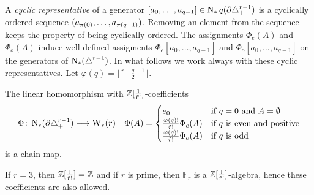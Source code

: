 A \emph{cyclic representative} of a generator $[a_0,\dots,a_{q-1}]\in \operatorname{N}_{*}{q}(\partial \triangle_{+}^{r-1})$ is a cyclically ordered sequence $(a_{\pi(0)},\dots,a_{\pi(q-1)})$. Removing an element from the sequence keeps the property of being cyclically ordered. The assignments $\Phi_e(A)$ and $\Phi_o(A)$ induce well defined assigments $\Phi_e[a_0,\dots,a_{q-1}]$ and $\Phi_o[a_0,\dots,a_{q-1}]$ on the generators of $\operatorname{N}_{*}(\triangle_{+}^{r-1})$. In what follows we work always with these cyclic representatives. Let $\varphi(q) = \lfloor\frac{r-q-1}{2}\rfloor$.
\begin{theorem} The linear homomorphism with $\mathbb{Z}[\frac{1}{\tilde{r}!}]$-coefficients
	\begin{align*}
		\Phi \colon \operatorname{N}_{*}(\partial \triangle_{+}^{r-1})& \longrightarrow \operatorname{W}_{*}(r)
		&
		\Phi(A) = \begin{cases}
			e_0 & \text{if $q=0$ and $A = \emptyset$}\\
			\frac{\varphi(q)!}{\tilde{r}!}\Phi_e(A) & \text{if $q$ is even and positive} \\
			\frac{\varphi(q)!}{\tilde{r}!}\Phi_o(A) & \text{if $q$ is odd}
		\end{cases}
	\end{align*}
	is a chain map.
\end{theorem}

\begin{remark}
	If $r=3$, then $\mathbb{Z}[\frac{1}{\tilde{r}!}] = \mathbb{Z}$ and if $r$ is prime, then $\mathbb{F}_r$ is a $\mathbb{Z}[\frac{1}{\tilde{r}!}]$-algebra, hence these coefficients are also allowed.
\end{remark}

